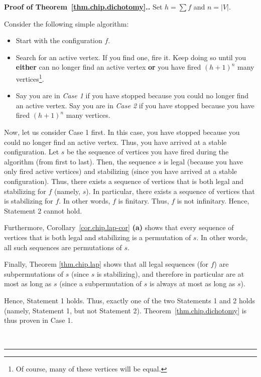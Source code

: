 \documentclass[numbers=enddot,12pt,final,onecolumn,notitlepage]{scrartcl}%
\theoremstyle{definition}
\newenvironment{proof}[1][Proof]{\noindent\textbf{#1.} }{\ \rule{0.5em}{0.5em}}
\let\sumnonlimits\sum
\renewcommand{\sum}{\sumnonlimits\limits}
\begin{document}
\begin{proof}[Proof of Theorem~\ref{thm.chip.dichotomy}.]
Set $h=\sum f$ and $n=\left\vert V\right\vert $.

Consider the following simple algorithm:

\begin{itemize}
\item Start with the configuration $f$.

\item Search for an active vertex. If you find one, fire it. Keep doing so
until you \textbf{either} can no longer find an active vertex \textbf{or} you
have fired $\left(  h+1\right)  ^{n}$ many vertices\footnote{Of course, many
of these vertices will be equal.}.

\item Say you are in \textit{Case 1} if you have stopped because you could no
longer find an active vertex. Say you are in \textit{Case 2} if you have
stopped because you have fired $\left(  h+1\right)  ^{n}$ many vertices.
\end{itemize}

Now, let us consider Case 1 first. In this case, you have stopped because you
could no longer find an active vertex. Thus, you have arrived at a stable
configuration. Let $s$ be the sequence of vertices you have fired during the
algorithm (from first to last). Then, the sequence $s$ is legal (because you
have only fired active vertices) and stabilizing (since you have arrived at a
stable configuration). Thus, there exists a sequence of vertices that is both
legal and stabilizing for $f$ (namely, $s$). In particular, there exists a
sequence of vertices that is stabilizing for $f$. In other words, $f$ is
finitary. Thus, $f$ is not infinitary. Hence, Statement 2 cannot hold.

Furthermore, Corollary~\ref{cor.chip.lap-cor} \textbf{(a)} shows that every
sequence of vertices that is both legal and stabilizing is a permutation of
$s$. In other words, all such sequences are permutations of $s$.

Finally, Theorem \ref{thm.chip.lap} shows that all legal sequences (for $f$)
are subpermutations of $s$ (since $s$ is stabilizing), and therefore in
particular are at most as long as $s$ (since a subpermutation of $s$ is always
at most as long as $s$).

Hence, Statement 1 holds. Thus, exactly one of the two Statements 1 and 2
holds (namely, Statement 1, but not Statement 2).
Theorem~\ref{thm.chip.dichotomy} is thus proven in Case 1.


\end{proof}
\end{document}
